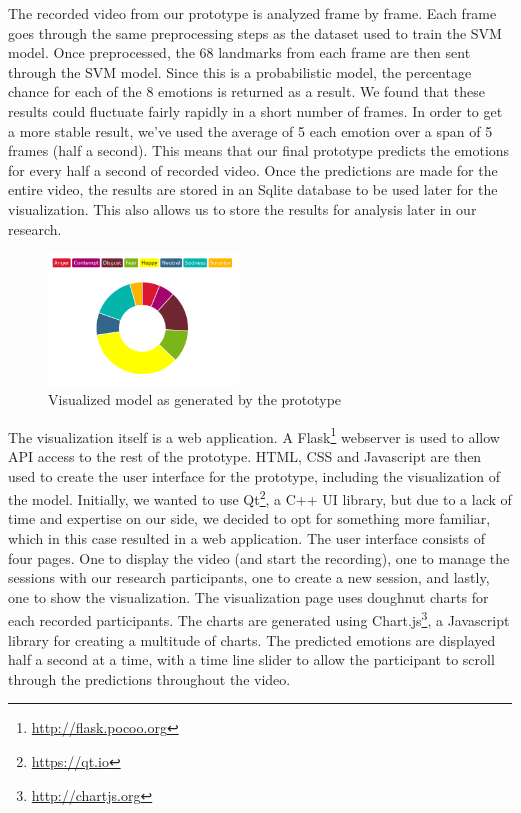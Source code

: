 \documentclass[sigconf]{acmart}
\begin{document}
The recorded video from our prototype is analyzed frame by frame. Each frame goes through the same preprocessing
steps as the dataset used to train the SVM model. Once preprocessed, the 68 landmarks from each frame are then
sent through the SVM model. Since this is a probabilistic model, the percentage chance for each of the 8 emotions
is returned as a result. We found that these results could fluctuate fairly rapidly in a short number of frames.
In order to get a more stable result, we've used the average of 5 each emotion over a span of 5 frames (half a
second). This means that our final prototype predicts the emotions for every half a second of recorded video.
Once the predictions are made for the entire video, the results are stored in an Sqlite database to be used
later for the visualization. This also allows us to store the results for analysis later in our research.

\begin{figure}[h]
    \centering
    \includegraphics[width=0.45\textwidth, scale=1]{visualization.png}
    \caption{Visualized model as generated by the prototype}
\end{figure}

The visualization itself is a web application. A Flask\footnote{\url{http://flask.pocoo.org}} webserver 
is used to allow API access to the rest of the prototype. HTML, CSS and Javascript are then used to 
create the user interface for the prototype, including the visualization of the model.
Initially, we wanted to use Qt\footnote{\url{https://qt.io}}, a C++ UI library, but due to a lack of time and
expertise on our side, we decided to opt for something more familiar, which in this case resulted in a web
application. The user interface consists of four pages. One to display the video (and start the recording),
one to manage the sessions with our research participants, one to create a new session, and lastly, one to
show the visualization. The visualization page uses doughnut charts for each recorded participants. The charts
are generated using Chart.js\footnote{\url{http://chartjs.org}}, a Javascript library for creating a multitude
of charts. The predicted emotions are displayed half a second at a time, with a time line slider to allow the
participant to scroll through the predictions throughout the video.
\end{document}

